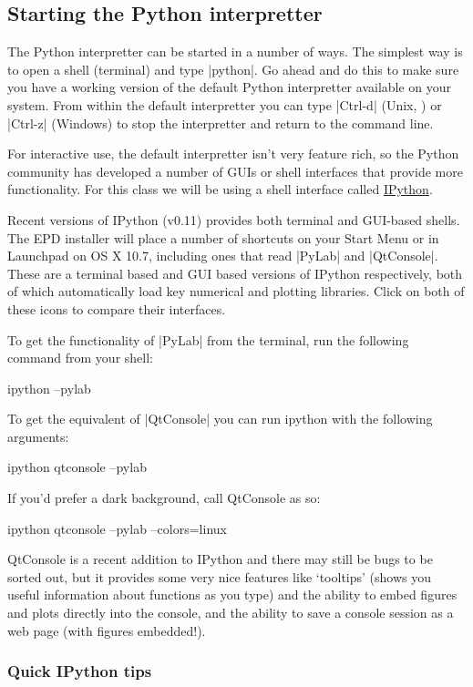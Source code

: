 
\subsection{Starting the Python interpretter}

The Python interpretter can be started in a number of ways. The simplest
way is to open a shell (terminal) and type |python|. Go ahead and do
this to make sure you have a working version of the default Python
interpretter available on your system. From within the default
interpretter you can type |Ctrl-d| (Unix, \OSX) or
|Ctrl-z| (Windows) to stop the interpretter and return to the
command line.

For interactive use, the default interpretter isn't very feature rich,
so the Python community has developed a number of GUIs or shell
interfaces that provide more functionality. For this class we will be
using a shell interface called \href{http://ipython.org/}{IPython}.

Recent versions of IPython (v0.11) provides both terminal and GUI-based
shells. The EPD installer will place a number of shortcuts on your Start
Menu or in Launchpad on OS X 10.7, including ones that read
|PyLab| and |QtConsole|. These are a terminal based
and GUI based versions of IPython respectively, both of which
automatically load key numerical and plotting libraries. Click on both
of these icons to compare their interfaces.

To get the functionality of |PyLab| from the terminal, run the
following command from your shell:
%
\begin{bash}
ipython --pylab
\end{bash}
%
To get the equivalent of |QtConsole| you can run ipython with
the following arguments:
%
\begin{bash}
ipython qtconsole --pylab
\end{bash}
%
If you'd prefer a dark background, call QtConsole as so:
%
\begin{bash}
ipython qtconsole --pylab --colors=linux
\end{bash}
%
QtConsole is a recent addition to IPython and there may still be bugs to
be sorted out, but it provides some very nice features like `tooltips'
(shows you useful information about functions as you type) and the
ability to embed figures and plots directly into the console, and the
ability to save a console session as a web page (with figures
embedded!).

\subsubsection{Quick IPython tips}


